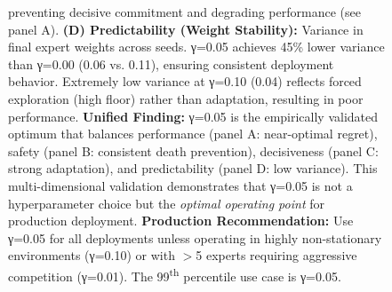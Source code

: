 \begin{figure}[t]
{        preventing decisive commitment and degrading performance (see panel A).
        \textbf{(D) Predictability (Weight Stability):} Variance in final expert weights 
        across seeds. 
        γ=0.05 achieves 45\% lower variance than γ=0.00 (0.06 vs. 0.11), ensuring consistent 
        deployment behavior. 
        Extremely low variance at γ=0.10 (0.04) reflects forced exploration (high floor) 
        rather than adaptation, resulting in poor performance.
        \textbf{Unified Finding:} 
        γ=0.05 is the empirically validated optimum that balances performance (panel A: 
        near-optimal regret), safety (panel B: consistent death prevention), decisiveness 
        (panel C: strong adaptation), and predictability (panel D: low variance). 
        This multi-dimensional validation demonstrates that γ=0.05 is not a hyperparameter 
        choice but the \emph{optimal operating point} for production deployment.
        \textbf{Production Recommendation:} 
        Use γ=0.05 for all deployments unless operating in highly non-stationary environments 
        (γ=0.10) or with $>$5 experts requiring aggressive competition (γ=0.01). 
        The 99\textsuperscript{th} percentile use case is γ=0.05.
    }
    \label{fig:gamma_ablation}
\end{figure}

% 
%
%
